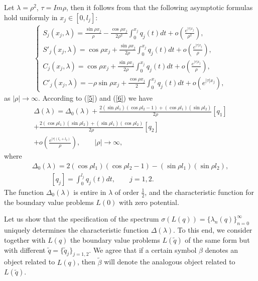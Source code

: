 \documentclass[reqno,11pt,centertags]{amsart}
\numberwithin{equation}{section}
\theoremstyle{definition}
\begin{document}
Let $\lambda=\rho^{2}$, $\tau=Im\rho$, then  it follows from \cite{Frei-Yurko-book} that the following asymptotic formulas hold uniformly in $x_{j}\in[0,l_{j}]$:
\begin{align}\label{6}
       \begin{cases}
           S_{j}(x_{j},\lambda)=\frac{\sin\rho x_{j}}{\rho}-\frac{\cos\rho x_{j}}{2\rho^{2}}\int_{0}^{x_{j}}q_{j}(t)dt+o\left(\frac{e^{|\tau|x_{j}}}{\rho^{2}}\right), \\
           S'_{j}(x_{j},\lambda)=\cos\rho x_{j}+\frac{\sin\rho x_{j}}{2\rho}\int_{0}^{x_{j}}q_{j}(t)dt+o\left(\frac{e^{|\tau|x_{j}}}{\rho}\right), \\
           C_{j}(x_{j},\lambda)=\cos\rho x_{j}+\frac{\sin\rho x_{j}}{2\rho}\int_{0}^{x_{j}}q_{j}(t)dt+o\left(\frac{e^{|\tau|x_{j}}}{\rho}\right),\\
           C'_{j}(x_{j},\lambda)=-\rho\sin\rho x_{j}+\frac{\cos\rho x_{j}}{2}\int_{0}^{x_{j}}q_{j}(t)dt+o\left(e^{|\tau|x_{j}}\right),
       \end{cases}
\end{align}
as $|\rho|\rightarrow\infty$. According to (\ref{5}) and (\ref{6}) we have
\begin{align}\label{7}
 \Delta(\lambda)= \Delta_{0}(\lambda)+\frac{2(\sin\rho l_{1})(\cos\rho l_{2}-1)+(\cos\rho l_{1})(\sin\rho l_{2})}{2\rho}[q_{1}] \nonumber \\
 +\frac{2(\cos\rho l_{1})(\sin\rho l_{2})+(\sin\rho l_{1})(\cos\rho l_{2})}{2\rho}[q_{2}]\nonumber \qquad\\
 +o\left(\frac{e^{|\tau|(l_{1}+l_{2})}}{\rho}\right),\qquad |\rho|\rightarrow\infty,\qquad\qquad\qquad\;\;
\end{align}
where
\begin{align}\label{8}
  \Delta_{0}(\lambda)=2(\cos\rho l_{1})(\cos\rho l_{2}-1)-(\sin\rho l_{1})(\sin\rho l_{2}),
\end{align}
\begin{align}\label{9}
  [q_{j}]=\int_{0}^{l_{j}}q_{j}(t)dt,\qquad j=1,2. \qquad\qquad\qquad\qquad
\end{align}
The function $\Delta_{0}(\lambda)$ is entire in $\lambda$ of order $\frac{1}{2}$, and the characteristic function for the boundary value problems $L(0)$ with zero potential.

Let us show that the specification of the spectrum $\sigma(L(q))=\{\lambda_{n}(q)\}_{n=0}^{\infty}$ uniquely determines the characteristic function
$\Delta(\lambda)$. To this end, we consider together with $L(q)$ the boundary value problems $L(\widetilde{q})$ of the same form but with different $\widetilde{q}=\{\widetilde{q}_{j}\}_{j=1,2}$. We agree that if a certain symbol $\beta$ denotes an object related to $L(q)$, then $\widetilde{\beta}$ will denote the analogous object related to $L(\widetilde{q})$.
\end{document}
